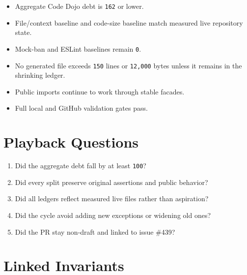 \begin{itemize}
\tightlist
\item
  Aggregate Code Dojo debt is \texttt{1\allowbreak{}6\allowbreak{}2} or lower.
\item
  File/context baseline and code-size baseline match measured live repository state.
\item
  Mock-ban and ESLint baselines remain \texttt{0}.
\item
  No generated file exceeds \texttt{1\allowbreak{}5\allowbreak{}0} lines or \texttt{1\allowbreak{}2\allowbreak{},\allowbreak{}0\allowbreak{}0\allowbreak{}0} bytes unless it remains in the shrinking ledger.
\item
  Public imports continue to work through stable facades.
\item
  Full local and GitHub validation gates pass.
\end{itemize}

\section{Playback Questions}\label{record-244-playback-questions}

\begin{enumerate}
\def\labelenumi{\arabic{enumi}.}
\tightlist
\item
  Did the aggregate debt fall by at least \texttt{1\allowbreak{}0\allowbreak{}0}?
\item
  Did every split preserve original assertions and public behavior?
\item
  Did all ledgers reflect measured live files rather than aspiration?
\item
  Did the cycle avoid adding new exceptions or widening old ones?
\item
  Did the PR stay non-draft and linked to issue \#439?
\end{enumerate}

\section{Linked Invariants}\label{record-244-linked-invariants}

